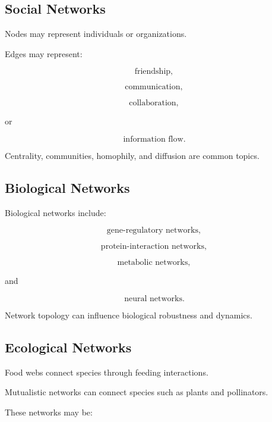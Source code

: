 \subsection{Social Networks}
\label{subsec:social-networks}

Nodes may represent individuals or organizations.

Edges may represent:

\[
\boxed{
\text{friendship},
}
\]

\[
\boxed{
\text{communication},
}
\]

\[
\boxed{
\text{collaboration},
}
\]

or

\[
\boxed{
\text{information flow}.
}
\]

Centrality, communities, homophily, and diffusion are common topics.

\subsection{Biological Networks}
\label{subsec:network-biological-networks}

Biological networks include:

\[
\boxed{
\text{gene-regulatory networks},
}
\]

\[
\boxed{
\text{protein-interaction networks},
}
\]

\[
\boxed{
\text{metabolic networks},
}
\]

and

\[
\boxed{
\text{neural networks}.
}
\]

Network topology can influence biological robustness and dynamics.

\subsection{Ecological Networks}
\label{subsec:ecological-networks}

Food webs connect species through feeding interactions.

Mutualistic networks can connect species such as plants and pollinators.

These networks may be:

